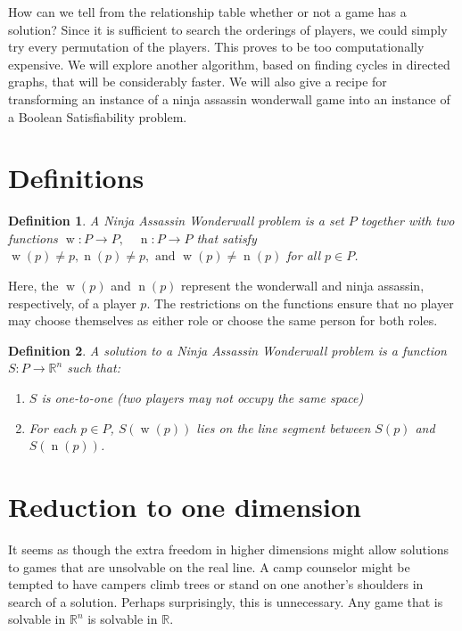\documentclass[12pt,x11names, rgb]{article}
\newtheorem*{definition}{Definition}
\DeclareMathOperator{\w}{w}
\DeclareMathOperator{\n}{n}
\begin{document}
    How can we tell from the relationship table whether or not a game has a solution? Since it is sufficient to search the orderings of players, we could simply try every permutation of the players. This proves to be too computationally expensive. We will explore another algorithm, based on finding cycles in directed graphs, that will be considerably faster. We will also give a recipe for transforming an instance of a ninja assassin wonderwall game into an instance of a Boolean Satisfiability problem.


\section{Definitions}

    \begin{definition}
    A \emph{Ninja Assassin Wonderwall problem} is a set $P$ together with two functions $\w:P\to P, \quad \n: P\to P$ that satisfy $\w(p) \neq p, \n(p) \neq p, \text{ and } \w(p) \neq \n(p)$ for all $p \in P$.
    \end{definition}

    Here, the $\w(p)$ and $\n(p)$ represent the wonderwall and ninja assassin, respectively, of a player $p$. The restrictions on the functions ensure that no player may choose themselves as either role or choose the same person for both roles. 


    \begin{definition}
    A \emph{solution} to a Ninja Assassin Wonderwall problem is a function $S: P\to \mathbb{R}^{n}$ such that:
        \begin{enumerate}
        \item $S$ is one-to-one (two players may not occupy the same space)
        \item For each $p \in P$, $S(\w(p))$ lies on the line segment between $S(p)$ and $S(\n(p))$.
        \end{enumerate}
    \end{definition}


\section{Reduction to one dimension}

    It seems as though the extra freedom in higher dimensions might allow solutions to games that are unsolvable on the real line. A camp counselor might be tempted to have campers climb trees or stand on one another's shoulders in search of a solution. Perhaps surprisingly, this is unnecessary. Any game that is solvable in $\mathbb{R}^n$ is solvable in $\mathbb{R}$.
\end{document}
